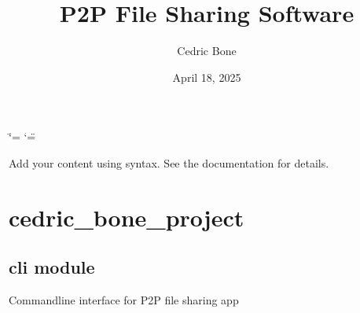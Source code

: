 \documentclass[letterpaper,10pt,english]{sphinxmanual}
\title{P2P File Sharing Software}
\date{April 18, 2025}
\author{Cedric Bone}
\begin{document}
\ifdefined\shorthandoff
  \ifnum\catcode`\=\string=\active\shorthandoff{=}\fi
  \ifnum\catcode`\"=\active{}\fi
\fi

\pagestyle{empty}
\sphinxmaketitle
\pagestyle{plain}
\sphinxtableofcontents
\pagestyle{normal}
\label{\detokenize{index::doc}}


\sphinxAtStartPar
Add your content using  syntax. See the
documentation for details.

\sphinxstepscope


\chapter{cedric\_bone\_project}
\label{\detokenize{modules:cedric-bone-project}}\label{\detokenize{modules::doc}}
\sphinxstepscope


\section{cli module}
\label{\detokenize{cli:module-cli}}\label{\detokenize{cli:cli-module}}\label{\detokenize{cli::doc}}
\sphinxAtStartPar
Command\sphinxhyphen{}line interface for P2P file sharing app
\end{document}
